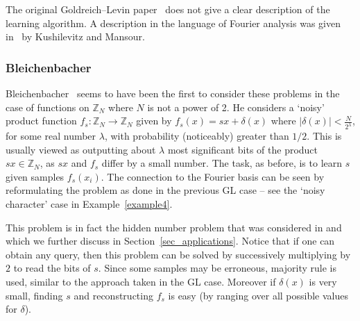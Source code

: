 \documentclass[11pt]{article}
\newtheorem{remark}[theorem]{Remark}
\theoremstyle{definition}
\newcommand{\Z}{\mathbb{Z}}
\begin{document}
The original Goldreich--Levin paper~\cite{GL} does not give a clear description of the learning algorithm. A description in the language of Fourier analysis was given in~\cite{KM} by Kushilevitz and Mansour.



%


\subsubsection{Bleichenbacher}


Bleichenbacher~\cite{Bleichenbacher} seems to have been the first to consider these problems in the case of functions on $\Z_N$ where $N$ is not a power of 2. He considers a `noisy' product function $f_s: \Z_N \to \Z_N$ given by $f_s(x) = sx + \delta(x)$ where $|\delta(x)| < \frac{N}{2^\lambda}$, for some real number $\lambda$, with probability (noticeably) greater than $1/2$. This is usually viewed as outputting about $\lambda$ most significant bits of the product $s x \in \Z_N$, as $s x$ and $f_s$ differ by a small number. The task, as before, is to learn $s$ given samples $f_s(x_i)$. The connection to the Fourier basis can be seen by reformulating the problem as done in the previous GL case -- see the `noisy character' case in Example~\ref{example4}.

This problem is in fact the hidden number problem that was considered in \cite{BV} and which we further discuss in Section~\ref{sec_applications}. Notice that if one can obtain any query, then this problem can be solved by successively multiplying by $2$ to read the bits of $s$. Since some samples may be erroneous, majority rule is used, similar to the approach taken in the GL case. Moreover if $\delta(x)$ is very small, finding $s$ and reconstructing $f_s$ is easy (by ranging over all possible values for $\delta$).
\end{document}
